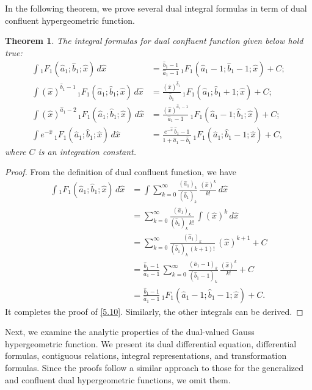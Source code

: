 \documentclass[11pt,a4paper,fleqn]{article}
\newtheorem{theorem}{Theorem}
\numberwithin{equation}{section}
\numberwithin{lemma}{section}
\numberwithin{theorem}{section}
\numberwithin{corollary}{section}
\begin{document}
In the following theorem, we prove several dual integral formulas in term of dual confluent hypergeometric function. 
\begin{theorem} 
The integral formulas for dual confluent function given below hold true:
\begin{align}
	\int {}_1F_1 (\widehat{a}_1; \widehat{b}_1;  \widehat{x}) \, d \widehat{x} & = \frac{\widehat{b}_1 - 1}{\widehat{a}_1 - 1} \, {}_1F_1 (\widehat{a}_1 - 1; \widehat{b}_1 - 1;  \widehat{x}) + C;\label{5.10}\\
	\int (\widehat{x})^{\widehat{b}_1 - 1} \, {}_1F_1 (\widehat{a}_1; \widehat{b}_1;  \widehat{x}) \, d \widehat{x} & = \frac{(\widehat{x})^{\widehat{b}_1}}{\widehat{b}_1} \, {}_1F_1 (\widehat{a}_1; \widehat{b}_1 + 1;  \widehat{x}) + C;\label{5.11}\\
	\int (\widehat{x})^{\widehat{a}_1 - 2} \, {}_1F_1 (\widehat{a}_1; \widehat{b}_1;  \widehat{x}) \, d \widehat{x} & = \frac{(\widehat{x})^{\widehat{a}_1 - 1}}{\widehat{a}_1 - 1} \, {}_1F_1 (\widehat{a}_1 - 1; \widehat{b}_1;  \widehat{x}) + C;\label{5.12}\\
	\int e^{-\widehat{x}} \, {}_1F_1 (\widehat{a}_1; \widehat{b}_1;  \widehat{x}) \, d \widehat{x} & = \frac{e^{-\widehat{x}} \,  {\widehat{b}_1 - 1}}{1 + \widehat{a}_1 - \widehat{b}_1} \, {}_1F_1 (\widehat{a}_1; \widehat{b}_1 - 1;  \widehat{x}) + C,\label{5.13}
\end{align}
where $C$ is an integration constant. 
\end{theorem}
\begin{proof}
	From the definition of dual confluent function, we have
\begin{align}
\int {}_1F_1 (\widehat{a}_1; \widehat{b}_1;  \widehat{x}) \, d \widehat{x} 
 & = \int \sum_{k = 0}^{\infty} \frac{(\widehat{a}_1)_k}{(\widehat{b}_1)_k} \, \frac{(\widehat{x})^k}{k !} \, d \widehat{x}\nonumber\\
& = \sum_{k = 0}^{\infty} \frac{(\widehat{a}_1)_k}{(\widehat{b}_1)_k \, k!} \, \int (\widehat{x})^k \, d \widehat{x} \nonumber\\
& = \sum_{k = 0}^{\infty} \frac{(\widehat{a}_1)_k}{(\widehat{b}_1)_k \, (k + 1)!} \,  (\widehat{x})^{k + 1}  + C\nonumber\\
& = \frac{\widehat{b}_1 - 1}{\widehat{a}_1 - 1} \, \sum_{k = 0}^{\infty} \frac{(\widehat{a}_1 - 1)_k}{(\widehat{b}_1 - 1)_k} \, \frac{(\widehat{x})^k}{k !} + C\nonumber\\
& = \frac{\widehat{b}_1 - 1}{\widehat{a}_1 - 1} \, {}_1F_1 (\widehat{a}_1 - 1; \widehat{b}_1 - 1;  \widehat{x}) + C. 
\end{align}
It completes the proof of \eqref{5.10}. Similarly, the other integrals can be derived. 
\end{proof}
Next, we examine the analytic properties of the dual-valued Gauss hypergeometric function. We present its dual differential equation, differential formulas, contiguous relations, integral representations, and transformation formulas. Since the proofs follow a similar approach to those for the generalized and confluent dual hypergeometric functions, we omit them.
\end{document}
